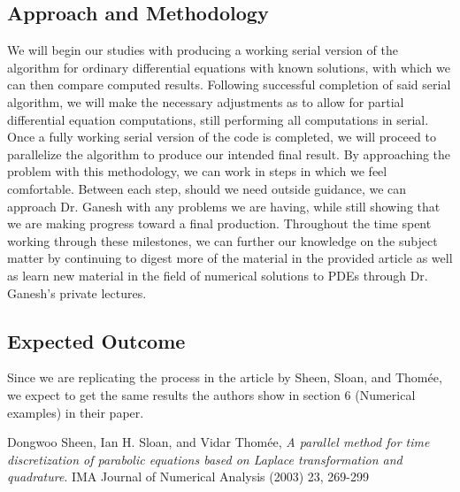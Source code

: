 \documentclass[letterpaper, 12pt]{article}
\begin{document}
	\subsection*{Approach and Methodology}
	\hspace{5mm} We will begin our studies with producing a working serial version of the algorithm for ordinary differential equations with known solutions, with which we can then compare computed results. Following successful completion of said serial algorithm, we will make the necessary adjustments as to allow for partial differential equation computations, still performing all computations in serial. Once a fully working serial version of the code is completed, we will proceed to parallelize the algorithm to produce our intended final result. By approaching the problem with this methodology, we can work in steps in which we feel comfortable. Between each step, should we need outside guidance, we can approach Dr. Ganesh with any problems we are having, while still showing that we are making progress toward a final production. Throughout the time spent working through these milestones, we can further our knowledge on the subject matter by continuing to digest more of the material in the provided article\cite{sheen03} as well as learn new material in the field of numerical solutions to PDEs through Dr. Ganesh's private lectures.
	
	\subsection*{Expected Outcome}
	\hspace{5mm} Since we are replicating the process in the article by Sheen, Sloan, and Thom\'{e}e, we expect to get the same results the authors show in section 6 (Numerical examples) in their paper.\cite{sheen03}
	
	\begin{thebibliography}{1}
			Dongwoo Sheen, Ian H. Sloan, and Vidar Thom\'{e}e,
			\emph{A parallel method for time discretization of parabolic equations based on Laplace transformation and quadrature}.
			IMA Journal of Numerical Analysis (2003) 23,
			269-299
			
	\end{thebibliography}
\end{document}
